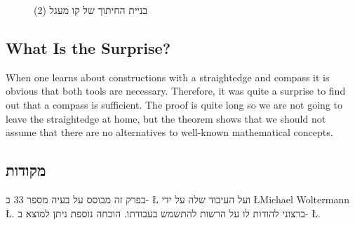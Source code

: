 \begin{figure}[htb]
\begin{center}
\end{center}
\caption{בניית החיתוך של קו מעגל (2)}\label{f.compass-circle5}
\end{figure}




\subsection*{What Is the Surprise?}

When one learns about constructions with a straightedge and compass it is obvious that both tools are necessary. Therefore,  it was quite a surprise to find out that a compass is sufficient. The proof is quite long so we are not going to leave the straightedge at home, but the theorem shows that we should not assume that there are no alternatives to well-known mathematical concepts.



\subsection*{מקודות}

בפרק זה מבוסס על בעיה מספר
$33$
ב-%
\L{\cite{dorrie1}}
ועל העיבוד שלה על ידי
\L{Michael Woltermann} \L{\cite{dorrie2}}.%
ברצוני להודות לו על הרשות להתשמש בעבודתו.
הוכחה נוספת ניתן למוצא ב-%
\L{\cite{mm}}.
